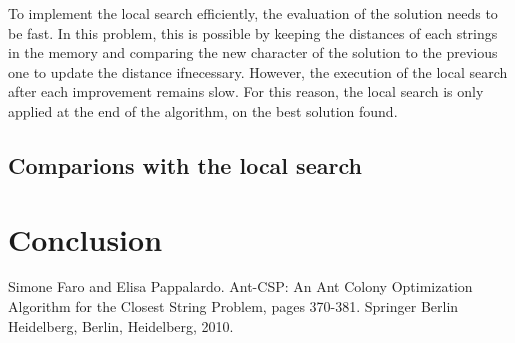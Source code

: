 \documentclass{article}
\begin{document}
To implement the local search efficiently, the evaluation of the solution needs to be fast.
In this problem, this is possible by keeping the distances of each strings in the memory and comparing the new character of the solution to the previous one to update the distance ifnecessary.
However, the execution of the local search after each improvement remains slow.
For this reason, the local search is only applied at the end of the algorithm, on the best solution found.

\subsection{Comparions with the local search}


\section*{Conclusion}

\begin{thebibliography}{2}

 Simone Faro and Elisa Pappalardo.
Ant-CSP: An Ant Colony Optimization Algorithm for the Closest String Problem, pages 370-381.
Springer Berlin
Heidelberg, Berlin, Heidelberg, 2010.

\end{thebibliography}
\end{document}
